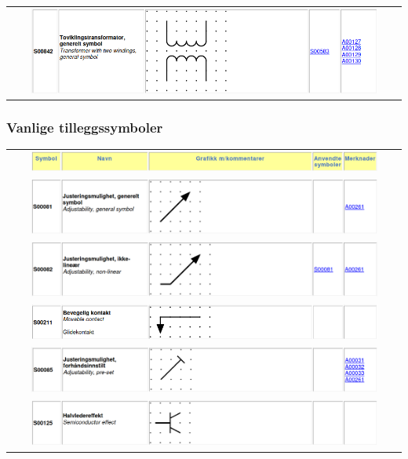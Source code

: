 \documentclass{article}
\begin{document}
\begin{center}
\begin{longtable}{c}
    \includegraphics[width=0.9\textwidth]{bilder/s00842.png}\\
    \end{longtable}
\end{center}
\subsubsection*{Vanlige tilleggssymboler}
\begin{center}
    \begin{longtable}{c}
        \includegraphics[width=0.9\textwidth]{bilder/header.png}\\
        \includegraphics[width=0.9\textwidth]{bilder/s00081.png}\\
        \includegraphics[width=0.9\textwidth]{bilder/s00082.png}\\
        \includegraphics[width=0.9\textwidth]{bilder/s00211.png}\\
        \includegraphics[width=0.9\textwidth]{bilder/s00085.png}\\
        \includegraphics[width=0.9\textwidth]{bilder/s00125.png}\\

\end{longtable}
\end{center}
\end{document}
